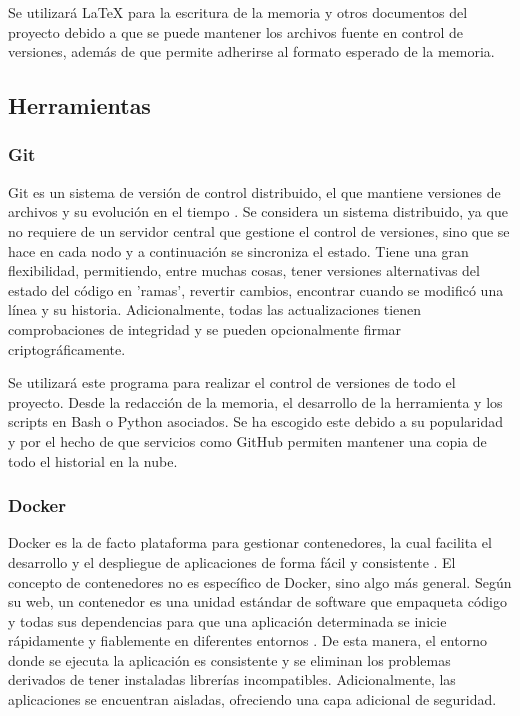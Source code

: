 Se utilizará LaTeX para la escritura de la memoria y otros documentos del proyecto debido a que se puede mantener los archivos fuente en control de versiones, además de que permite adherirse al formato esperado de la memoria.

\subsection{Herramientas}

\subsubsection{Git}

Git es un sistema de versión de control distribuido, el que mantiene versiones de archivos y su evolución en el tiempo \cite{chacon2014pro}. Se considera un sistema distribuido, ya que no requiere de un servidor central que gestione el control de versiones, sino que se hace en cada nodo y a continuación se sincroniza el estado. Tiene una gran flexibilidad, permitiendo, entre muchas cosas, tener versiones alternativas del estado del código en 'ramas', revertir cambios, encontrar cuando se modificó una línea y su historia. Adicionalmente, todas las actualizaciones tienen comprobaciones de integridad y se pueden opcionalmente firmar criptográficamente.

Se utilizará este programa para realizar el control de versiones de todo el proyecto. Desde la redacción de la memoria, el desarrollo de la herramienta y los scripts en Bash o Python asociados. Se ha escogido este debido a su popularidad y por el hecho de que servicios como GitHub permiten mantener una copia de todo el historial en la nube.

\subsubsection{Docker}

Docker es la de facto plataforma para gestionar contenedores, la cual facilita el desarrollo y el despliegue de aplicaciones de forma fácil y consistente \cite{dockerruntime}. El concepto de contenedores no es específico de Docker, sino algo más general. Según su web, un contenedor es una unidad estándar de software que empaqueta código y todas sus dependencias para que una aplicación determinada se inicie rápidamente y fiablemente en diferentes entornos \cite{dockerwhatsacontainer}. De esta manera, el entorno donde se ejecuta la aplicación es consistente y se eliminan los problemas derivados de tener instaladas librerías incompatibles. Adicionalmente, las aplicaciones se encuentran aisladas, ofreciendo una capa adicional de seguridad.

